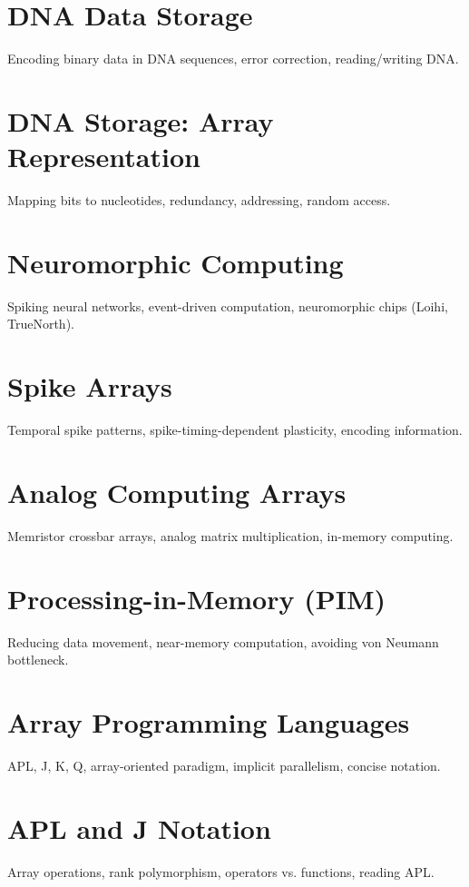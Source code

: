 
\chapter{DNA Data Storage}
Encoding binary data in DNA sequences, error correction, reading/writing DNA.

\chapter{DNA Storage: Array Representation}
Mapping bits to nucleotides, redundancy, addressing, random access.

\chapter{Neuromorphic Computing}
Spiking neural networks, event-driven computation, neuromorphic chips (Loihi, TrueNorth).

\chapter{Spike Arrays}
Temporal spike patterns, spike-timing-dependent plasticity, encoding information.

\chapter{Analog Computing Arrays}
Memristor crossbar arrays, analog matrix multiplication, in-memory computing.

\chapter{Processing-in-Memory (PIM)}
Reducing data movement, near-memory computation, avoiding von Neumann bottleneck.


\chapter{Array Programming Languages}
APL, J, K, Q, array-oriented paradigm, implicit parallelism, concise notation.

\chapter{APL and J Notation}
Array operations, rank polymorphism, operators vs. functions, reading APL.

